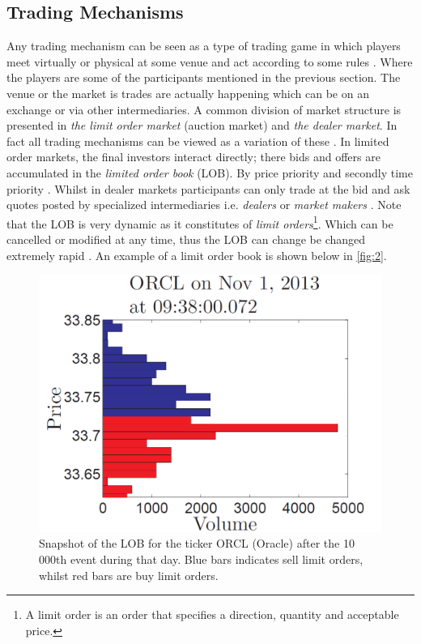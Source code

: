 \documentclass{kththesis}
\theoremstyle{definition}
\begin{document}
\subsection{Trading Mechanisms}
Any trading mechanism can be seen as a type of trading game in which players meet virtually or physical at some venue and act according to some rules \parencite{o1995market}. Where the players are some of the participants mentioned in the previous section. The venue or the market is trades are actually happening which can be on an exchange or via other intermediaries. A common division of market structure is presented in \textcite{foucault2013market} \textit{the limit order market} (auction market) and \textit{the dealer market}. In fact all trading mechanisms can be viewed as a variation of these \parencite{foucault2013market}.
\newline
\newline
In limited order markets, the final investors interact directly; there bids and offers are accumulated in the \textit{limited order book} (LOB). By price priority and secondly time priority \parencite{hasbrouck2007empirical}. Whilst in dealer markets participants can only trade at the bid and ask quotes posted by specialized intermediaries i.e. \textit{dealers} or \textit{market makers} \parencite{foucault2013market}. Note that the LOB is very dynamic as it constitutes of \textit{limit orders}\footnote{A limit order is an order that specifies a direction, quantity and acceptable price.}. Which can be cancelled or modified at any time, thus the LOB can change be changed extremely rapid \parencite{hasbrouck2007empirical}. An example of a limit order book is shown below in \autoref{fig:2}.
\begin{figure}[H]
    \centering
    \includegraphics[scale=.65]{LOBex.PNG}
    \caption{Snapshot of the LOB for the ticker ORCL (Oracle) after the 10 000th event during that day. Blue bars indicates sell limit orders, whilst red bars are buy limit orders.}
    \label{fig:2}
\end{figure}
\end{document}
